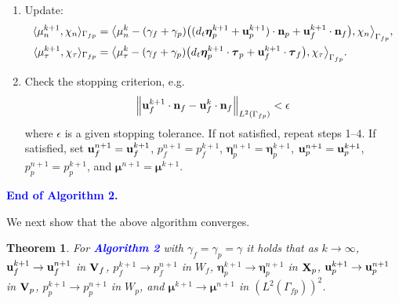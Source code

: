 \documentclass[11pt]{article}
\def\u{{\bf u}}
\def\n{{\bf n}}
\def\btau{\boldsymbol{\tau}}
\def\bbeta{\boldsymbol{\eta}}
\def\bmu{\boldsymbol{\mu}}
\def\V{{\bf V}}
\def\X{{\bf X}}
\def\<{\langle}
\def\>{\rangle}
\def\dt{d_t}
\newtheorem{theorem}{Theorem}[section]
\begin{document}
\begin{enumerate}
\item Update: 
%
{
\begin{subequations}\label{mu-defn-iter}   
\begin{align}
  \<\mu_n^{k+1},\chi_n\>_{\Gamma_{fp}} & = \big\<\mu_n^k -(\gamma_f + \gamma_p)\big((\dt \bbeta_p^{k+1}
  + \u_p^{k+1})\cdot\n_p + \u_f^{k+1}\cdot\n_f\big),\chi_n\big\>_{\Gamma_{fp}},
  \label{mu-n-defn-iter} \\
  \<\mu_{\tau}^{k+1},\chi_\tau\>_{\Gamma_{fp}}  & = \big\<\mu_{\tau}^k -(\gamma_f + \gamma_p)\big(
  \dt \bbeta_p^{k+1} \cdot\btau_p + \u_f^{k+1}\cdot\btau_f  \big),\chi_\tau\big\>_{\Gamma_{fp}}.
  \label{mu-t-defn-iter} 
\end{align}
\end{subequations}
}
%
\item Check the stopping criterion, e.g.
\begin{equation}\label{eq:stopping}
\left\lVert \u_f^{k+1}\cdot\n_f - \u_f^{k}\cdot\n_f \right\rVert_{L^2(\Gamma_{fp})}< \epsilon
\end{equation}
where $\epsilon$ is a given stopping tolerance. If not satisfied, repeat steps 1--4. If satisfied,
set $\u_f^{n+1} = \u_f^{k+1}$, $p_f^{n+1} = p_f^{k+1}$, $\bbeta^{n+1}_p = \bbeta^{k+1}_p$, $\u_p^{n+1} = \u_p^{k+1}$, $p_p^{n+1} = p_p^{k+1}$, and $\boldsymbol{\mu}^{n+1} = \boldsymbol{\mu}^{k+1}$.
\end{enumerate}

\medskip
\noindent
\textcolor{blue}{{\bf End of Algorithm 2.}}

\medskip
We next show that the above algorithm converges.

\begin{theorem}\label{iter-semidiscrete-converge}
  For \textcolor{blue}{{\bf Algorithm 2}}
  with $\gamma_f = \gamma_p = \gamma$ it holds that as $k \to \infty$, $\u_f^{k+1} \to \u_f^{n+1}$ in $\V_f$, $p_f^{k+1} \to p_f^{n+1}$ in $W_f$, $\bbeta_p^{k+1} \to \bbeta_p^{n+1}$ in $\X_p$, $\u_p^{k+1} \to \u_p^{n+1}$ in $\V_p$, $p_p^{k+1} \to p_p^{n+1}$ in $W_p$, and $\bmu^{k+1} \to \bmu^{n+1}$ in $(L^2(\Gamma_{fp}))^2$.
\end{theorem}
\end{document}
